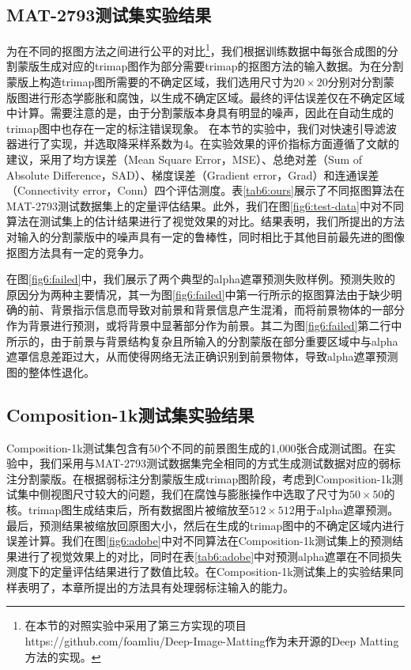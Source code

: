 \subsection{MAT-2793测试集实验结果}
为在不同的抠图方法之间进行公平的对比\footnote{在本节的对照实验中采用了第三方实现的项目https://github.com/foamliu/Deep-Image-Matting作为未开源的Deep Matting方法的实现。}，我们根据训练数据中每张合成图的分割蒙版生成对应的trimap图作为部分需要trimap的抠图方法的输入数据。为在分割蒙版上构造trimap图所需要的不确定区域，我们选用尺寸为$20\times20$分别对分割蒙版图进行形态学膨胀和腐蚀，以生成不确定区域。最终的评估误差仅在不确定区域中计算。需要注意的是，由于分割蒙版本身具有明显的噪声，因此在自动生成的trimap图中也存在一定的标注错误现象。
在本节的实验中，我们对快速引导滤波器\cite{he2015fast}进行了实现，并选取降采样系数为4。在实验效果的评价指标方面遵循了文献\parencite{rhemann2009perceptually}的建议，采用了均方误差（Mean Square Error，MSE）、总绝对差（Sum of Absolute Difference，SAD）、梯度误差（Gradient error，Grad）和连通误差（Connectivity error，Conn）四个评估测度。表\ref{tab6:ours}展示了不同抠图算法在MAT-2793测试数据集上的定量评估结果。此外，我们在图\ref{fig6:test-data}中对不同算法在测试集上的估计结果进行了视觉效果的对比。结果表明，我们所提出的方法对输入的分割蒙版中的噪声具有一定的鲁棒性，同时相比于其他目前最先进的图像抠图方法具有一定的竞争力。


在图\ref{fig6:failed}中，我们展示了两个典型的alpha遮罩预测失败样例。预测失败的原因分为两种主要情况，其一为图\ref{fig6:failed}中第一行所示的抠图算法由于缺少明确的前、背景指示信息而导致对前景和背景信息产生混淆，而将前景物体的一部分作为背景进行预测，或将背景中显著部分作为前景。其二为图\ref{fig6:failed}第二行中所示的，由于前景与背景结构复杂且所输入的分割蒙版在部分重要区域中与alpha遮罩信息差距过大，从而使得网络无法正确识别到前景物体，导致alpha遮罩预测图的整体性退化。

\subsection{Composition-1k测试集实验结果}
Composition-1k测试集\cite{xu2017deep}包含有50个不同的前景图生成的1,000张合成测试图。在实验中，我们采用与MAT-2793测试数据集完全相同的方式生成测试数据对应的弱标注分割蒙版。在根据弱标注分割蒙版生成trimap图阶段，考虑到Composition-1k测试集中侧视图尺寸较大的问题，我们在腐蚀与膨胀操作中选取了尺寸为$50\times50$的核。trimap图生成结束后，所有数据图片被缩放至$512\times512$用于alpha遮罩预测。最后，预测结果被缩放回原图大小，然后在生成的trimap图中的不确定区域内进行误差计算。我们在图\ref{fig6:adobe}中对不同算法在Composition-1k测试集上的预测结果进行了视觉效果上的对比，同时在表\ref{tab6:adobe}中对预测alpha遮罩在不同损失测度下的定量评估结果进行了数值比较。在Composition-1k测试集上的实验结果同样表明了，本章所提出的方法具有处理弱标注输入的能力。

